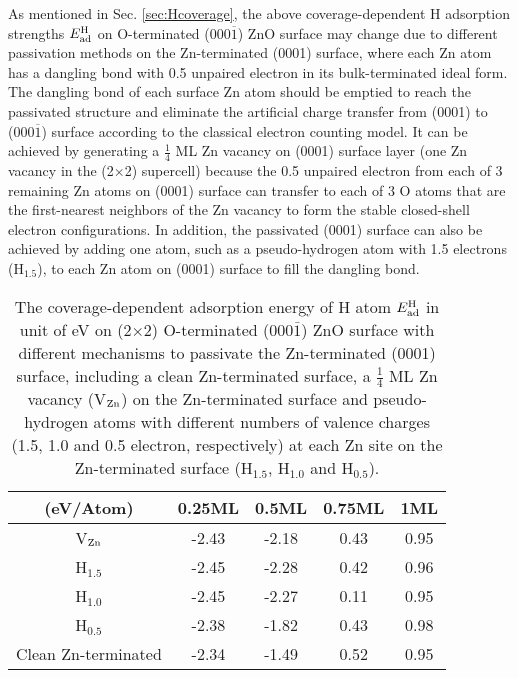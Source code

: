 
As mentioned in Sec. \ref{sec:Hcoverage}, the above coverage-dependent H adsorption strengths $E_{\textup{ad}}^{\textup{H}}$ on O-terminated (000$\overline{1}$) ZnO surface may change due to different passivation methods on the Zn-terminated (0001) surface, where each Zn atom has a dangling bond with 0.5 unpaired electron in its bulk-terminated ideal form. The dangling bond of each surface Zn atom should be emptied to reach the passivated structure and eliminate the artificial charge transfer from (0001) to (000$\overline{1}$) surface according to the classical electron counting model\cite{pashley1989electron}. It can be achieved by generating a  $\frac{1}{4}$ ML Zn vacancy on (0001) surface layer (one Zn vacancy in the (2$\times$2) supercell) because the 0.5 unpaired electron from each of 3 remaining Zn atoms on (0001) surface can transfer to each of 3 O atoms that are the first-nearest neighbors of the Zn vacancy to form the stable closed-shell electron configurations. In addition, the passivated (0001) surface can also be achieved by adding one atom, such as a pseudo-hydrogen atom with 1.5 electrons (H$_{1.5}$), to each Zn atom on (0001) surface to fill the dangling bond.

\begin{table}[!htbp]
\centering
\caption[Comparison of different passivation mechanisms for the coverage-dependent adsorption energy of H atom]{The coverage-dependent adsorption energy of H atom $E_{\textup{ad}}^{\textup{H}}$ in unit of eV on (2$\times$2) O-terminated (000$\bar{1}$) ZnO surface with different mechanisms to passivate the Zn-terminated (0001) surface, including a clean Zn-terminated surface, a $\frac{1}{4}$ ML Zn vacancy (V$_{\textup{Zn}}$) on the Zn-terminated surface and pseudo-hydrogen atoms with different numbers of valence charges (1.5, 1.0 and 0.5 electron, respectively) at each Zn site on the Zn-terminated surface (H$_{1.5}$, H$_{1.0}$ and H$_{0.5}$).}
\label{tab:pass}
\begin{tabular}{ccccc}
\hline
\hline
(eV/Atom)       & 0.25ML & 0.5ML & 0.75ML & 1ML  \\ \hline
V$_{\textup{Zn}}$     & -2.43  & -2.18 & 0.43   & 0.95 \\
H$_{1.5}$         & -2.45  & -2.28 & 0.42   & 0.96 \\
H$_{1.0}$         & -2.45  & -2.27 & 0.11   & 0.95 \\
H$_{0.5}$         & -2.38  & -1.82 & 0.43   & 0.98 \\ 
Clean Zn-terminated & -2.34  & -1.49 & 0.52   & 0.95 \\
\hline
\hline
\end{tabular}
\end{table}


